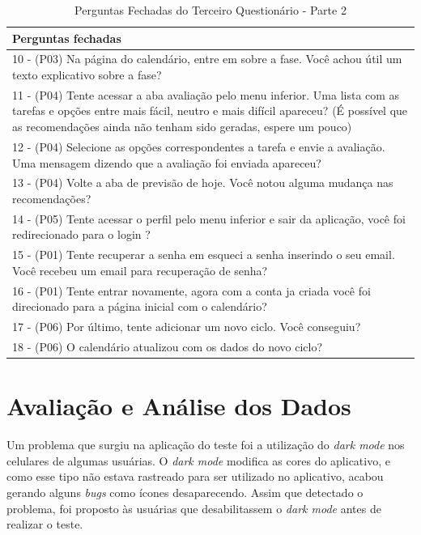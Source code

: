 \begin{table}[htbp]
    \centering
    \caption{Perguntas Fechadas do Terceiro Questionário - Parte 2}
    \label{tab17}
    \begin{tabular}{p{15cm}}
        \toprule
        \textbf{Perguntas fechadas} \\
        \midrule
        10 - (P03) Na página do calendário, entre em sobre a fase. Você achou útil um texto explicativo sobre a fase? \\
        \midrule
        11 - (P04) Tente acessar a aba avaliação pelo menu inferior. Uma lista com as tarefas e opções entre mais fácil, neutro e mais difícil apareceu? (É possível que as recomendações ainda não tenham sido geradas, espere um pouco) \\
        \midrule
        12 - (P04) Selecione as opções correspondentes a tarefa e envie a avaliação. Uma mensagem dizendo que a avaliação foi enviada apareceu? \\
        \midrule
        13 - (P04) Volte a aba de previsão de hoje. Você notou alguma mudança nas recomendações? \\
        \midrule
        14 - (P05) Tente acessar o perfil pelo menu inferior e sair da aplicação, você foi redirecionado para o login ? \\
        \midrule
        15 - (P01) Tente recuperar a senha em esqueci a senha inserindo o seu email. Você recebeu um email para recuperação de senha? \\
        \midrule
        16 - (P01) Tente entrar novamente, agora com a conta ja criada você foi direcionado para a página inicial com o calendário? \\
        \midrule
        17 - (P06) Por último, tente adicionar um novo ciclo. Você conseguiu? \\
        \midrule
        18 - (P06) O calendário atualizou com os dados do novo ciclo? \\
        \bottomrule
    \end{tabular}
\end{table}


\section{Avaliação e Análise dos Dados}



Um problema que surgiu na aplicação do teste foi a utilização do \emph{dark mode} nos celulares de algumas usuárias. O \emph{dark mode} 
modifica as cores do aplicativo, e como esse tipo não estava rastreado para ser utilizado no aplicativo, acabou gerando alguns \emph{bugs} 
como ícones desaparecendo. Assim que detectado o problema, foi proposto às usuárias que desabilitassem o \emph{dark mode} antes de realizar o teste.

